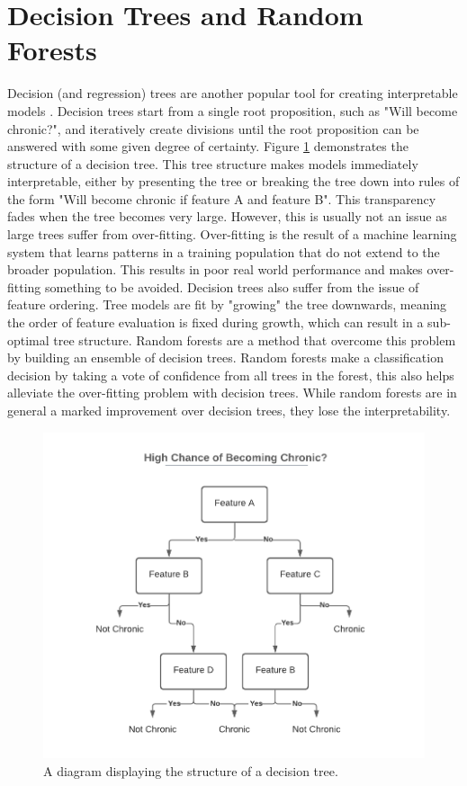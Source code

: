 \section{Decision Trees and Random Forests} \label{chap:rl:tree}
Decision (and regression) trees are another popular tool for creating interpretable models \cite{friedman2001greedy} \cite{chen2016xgboost} \cite{chan2017evidence} \cite{kube2019allocating}. Decision trees start from a single root proposition, such as "Will become chronic?", and iteratively create divisions until the root proposition can be answered with some given degree of certainty. Figure \ref{fig:example-decision-tree} demonstrates the structure of a decision tree. This tree structure makes models immediately interpretable, either by presenting the tree or breaking the tree down into rules of the form "Will become chronic if feature A and feature B". This transparency fades when the tree becomes very large. However, this is usually not an issue as large trees suffer from over-fitting. Over-fitting is the result of a machine learning system that learns patterns in a training population that do not extend to the broader population. This results in poor real world performance and makes over-fitting something to be avoided. Decision trees also suffer from the issue of feature ordering. Tree models are fit by "growing" the tree downwards, meaning the order of feature evaluation is fixed during growth, which can result in a sub-optimal tree structure.
Random forests are a method \cite{toros2019early} that overcome this problem by building an ensemble of decision trees. Random forests make a classification decision by taking a vote of confidence from all trees in the forest, this also helps alleviate the over-fitting problem with decision trees. While random forests are in general a marked improvement over decision trees, they lose the interpretability.

\begin{figure}[ht]
    \centering
    \includegraphics[width=1\textwidth]{Figures/Decision-Tree-Example.pdf}
    \caption{A diagram displaying the structure of a decision tree.}
    \label{fig:example-decision-tree}
\end{figure}

